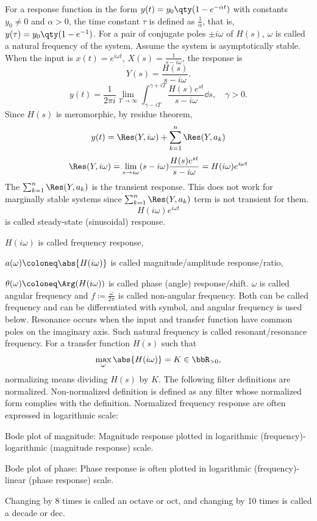 \documentclass[a4paper,12pt]{report}
\begin{document}
For a response function in the form $y(t)=y_0\qty(1-e^{-\alpha t})$ with constants $y_0\neq 0$ and $\alpha>0$, the time constant $\tau$ is defined as $\frac{1}{\alpha}$, that is, $y(\tau)=y_0\qty(1-e^{-1})$.
For a pair of conjugate poles $\pm i\omega$ of $H(s)$, $\omega$ is called a natural frequency of the system.
Assume the system is asymptotically stable. When the input is $x(t)=e^{i\omega t}$, $X(s)=\frac{1}{s-i\omega}$, the response is
\[Y(s)=\frac{H(s)}{s-i\omega}.\]
\[y(t)=\frac{1}{2\pi i}\lim_{T\to\infty}\int_{\gamma-iT}^{\gamma+iT}\frac{H(s)e^{st}}{s-i\omega}\dd{s},\quad\gamma>0.\]
Since $H(s)$ is meromorphic, by residue theorem,
\[y(t)=\Res(Y,i\omega)+\sum_{k=1}^n\Res(Y,a_k)\]
\[\Res(Y,i\omega)=\lim_{s\to i\omega}(s-i\omega)\frac{H(s)e^{st}}{s-i\omega}=H(i\omega)e^{i\omega t}\]
The $\sum_{k=1}^n\Res(Y,a_k)$ is the transient response. This does not work for marginally stable systems since $\sum_{k=1}^n\Res(Y,a_k)$ term is not transient for them.
\[H(i\omega)e^{i\omega t}\]
is called steady-state (sinusoidal) response.
\bit
\item $H(i\omega)$ is called frequency response,
\item $a(\omega)\coloneq\abs{H(i\omega)}$ is called magnitude/amplitude response/ratio,
\item $\theta(\omega)\coloneq\Arg(H(i\omega))$ is called phase (angle) response/shift.
\eit
$\omega$ is called angular frequency and $f\coloneq\frac{\omega}{2\pi}$ is called non-angular frequency. Both can be called frequency and can be differentiated with symbol, and angular frequency is used below.
Resonance occurs when the input and transfer function have common poles on the imaginary axis. Such natural frequency is called resonant/resonance frequency.
For a transfer function $H(s)$ such that
\[\max_{\omega}\abs{H(i\omega)}=K\in\bbR_{>0},\]
normalizing means dividing $H(s)$ by $K$. The following filter definitions are normalized. Non-normalized definition is defined as any filter whose normalized form complies with the definition.
Normalized frequency response are often expressed in logarithmic scale:
\bit
\item Bode plot of magnitude: Magnitude response plotted in logarithmic (frequency)-logarithmic (magnitude response) scale.
\item Bode plot of phase: Phase response is often plotted in logarithmic (frequency)-linear (phase response) scale.
\item Changing by 8 times is called an octave or oct, and changing by 10 times is called a decade or dec.
\end{document}
